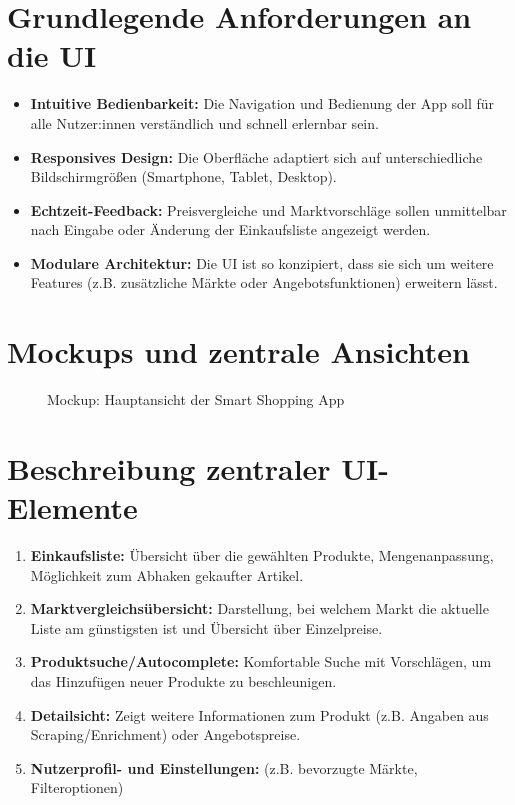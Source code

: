 \documentclass[12pt, a4paper]{report} %
\begin{document}
\section{Grundlegende Anforderungen an die UI}
\begin{itemize}
    \item \textbf{Intuitive Bedienbarkeit:} Die Navigation und Bedienung der App soll für alle Nutzer:innen verständlich und schnell erlernbar sein.
    \item \textbf{Responsives Design:} Die Oberfläche adaptiert sich auf unterschiedliche Bildschirmgrößen (Smartphone, Tablet, Desktop).
    \item \textbf{Echtzeit-Feedback:} Preisvergleiche und Marktvorschläge sollen unmittelbar nach Eingabe oder Änderung der Einkaufsliste angezeigt werden.
    \item \textbf{Modulare Architektur:} Die UI ist so konzipiert, dass sie sich um weitere Features (z.B. zusätzliche Märkte oder Angebotsfunktionen) erweitern lässt.
\end{itemize}

\section{Mockups und zentrale Ansichten}
\begin{figure}[h!]
    \centering
    \caption{Mockup: Hauptansicht der Smart Shopping App}
    \label{fig:ui_mockup}
\end{figure}

\section{Beschreibung zentraler UI-Elemente}
\begin{enumerate}
    \item \textbf{Einkaufsliste:} Übersicht über die gewählten Produkte, Mengenanpassung, Möglichkeit zum Abhaken gekaufter Artikel.
    \item \textbf{Marktvergleichsübersicht:} Darstellung, bei welchem Markt die aktuelle Liste am günstigsten ist und Übersicht über Einzelpreise.
    \item \textbf{Produktsuche/Autocomplete:} Komfortable Suche mit Vorschlägen, um das Hinzufügen neuer Produkte zu beschleunigen.
    \item \textbf{Detailsicht:} Zeigt weitere Informationen zum Produkt (z.B. Angaben aus Scraping/Enrichment) oder Angebotspreise.
    \item \textbf{Nutzerprofil- und Einstellungen:} (z.B. bevorzugte Märkte, Filteroptionen)
\end{enumerate}
\end{document}
